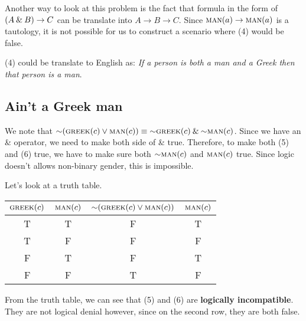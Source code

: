 \documentclass{article}
\begin{document}
Another way to look at this problem is the fact that formula in the form of $ (A \mathbin{\&} B) \rightarrow C $ can be translate into $ A \rightarrow B \rightarrow C $. Since $ \textsc{man}(a) \rightarrow \textsc{man}(a) $ is a tautology, it is not possible for us to construct a scenario where (4) would be false.

(4) could be translate to English as: \textit{If a person is both a man and a Greek then that person is a man}.

\subsection{Ain't a Greek man}
We note that $\mathord{\sim} (\textsc{greek}(c) \lor \textsc{man}(c)) \equiv \mathord{\sim} \textsc{greek}(c) \mathbin{\&} \mathord{\sim} \textsc{man}(c)$. Since we have an \& operator, we need to make both side of \& true. Therefore, to make both (5) and (6) true, we have to make sure both $\mathord{\sim} \textsc{man}(c)$ and $\textsc{man}(c)$ true. Since logic doesn't allows non-binary gender, this is impossible.

Let's look at a truth table. 

\begin{tabular}{cc|cc}
    $\textsc{greek}(c)$ & $\textsc{man}(c)$ & $\mathord{\sim} (\textsc{greek}(c) \lor \textsc{man}(c))$ & $\textsc{man}(c)$ \\ \hline 
    T & T & F & T\\
    T & F & F & F\\
    F & T & F & T\\
    F & F & T & F\\
\end{tabular}

From the truth table, we can see that (5) and (6) are \textbf{logically incompatible}. They are not logical denial however, since on the second row, they are both false. 
\end{document}
